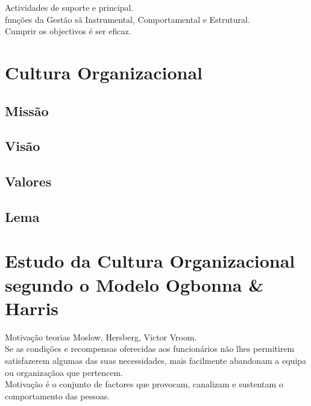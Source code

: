 Actividades de suporte e principal.\\
funções da Gestão sã Instrumental, Comportamental e Estrutural.\\

Cumprir os objectivos é ser eficaz.\\


\section{Cultura Organizacional}


\subsection{Missão}

\subsection{Visão}

\subsection{Valores}

\subsection{Lema}






\section{Estudo da Cultura Organizacional segundo o Modelo Ogbonna \& Harris}


Motivação teorias Moslow, Hersberg, Victor Vroom.\\
Se as condições e recompensas oferecidas aos funcionários não lhes permitirem satisfazerem algumas das suas necessidades, mais facilmente abandonam a equipa ou organizaçãoa que pertencem.\\
Motivação é o conjunto de factores que provocam, canalizam e sustentam o comportamento das pessoas.\\







\newpage
